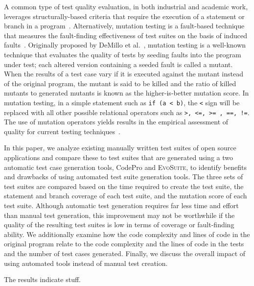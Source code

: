 
A common type of test quality evaluation, in both industrial and academic work, leverages structurally-based criteria
that require the execution of a statement or branch in a program~\cite{weyuker1988evaluation}.  Alternatively, mutation
testing is a fault-based technique that measures the fault-finding effectiveness of test suites on the basis of induced
faults~\cite{demillo1978hints, hamlet1977testing}.  Originally proposed by DeMillo et al.~\cite{demillo1978hints},
mutation testing is a well-known technique that evaluates the quality of tests by seeding faults into the program under
test; each altered version containing a seeded fault is called a mutant. When the results of a test case vary if it is
executed against the mutant instead of the original program, the mutant is said to be killed and the ratio of killed
mutants to generated mutants is known as the higher-is-better mutation score. In mutation testing, in a simple statement
such as \texttt{if (a < b)}, the \texttt{<} sign will be replaced with all other possible relational operators such as
\texttt{>, <=, >= , ==, !=}. The use of mutation operators yields results in the empirical assessment of quality for
current testing techniques~\cite{andrews2005mutation}.  


In this paper, we analyze existing manually written test suites of open source applications and compare these to test
suites that are generated using a two automatic test case generation tools, CodePro and \textsc{EvoSuite}, to identify
benefits and drawbacks of using automated test suite generation tools.  The three sets of test suites are compared based
on the time required to create the test suite, the statement and branch coverage of each test suite, and the mutation
score of each test suite.  Although automatic test generation requires far less time and effort than manual test
generation, this improvement may not be worthwhile if the quality of the resulting test suites is low in terms of
coverage or fault-finding ability.  We additionally examine how the code complexity and lines of code in the original
program relate to the code complexity and the lines of code in the tests and the number of test cases generated.
Finally, we discuss the overall impact of using automated tools instead of manual test creation.

The results indicate stuff.

